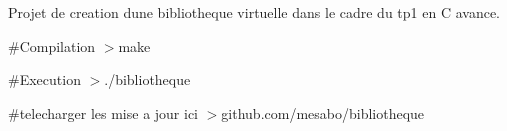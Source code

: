 Projet de creation d\textquotesingle{}une bibliotheque virtuelle dans le cadre du tp1 en C avance.

\#\+Compilation $>$make

\#\+Execution $>$./bibliotheque

\#telecharger les mise a jour ici $>$github.\+com/mesabo/bibliotheque 
